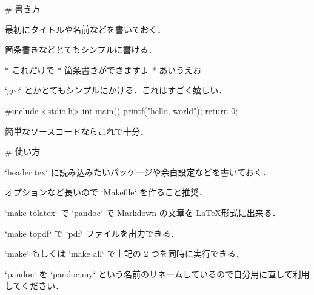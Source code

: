 % 


# 書き方

最初にタイトルや名前などを書いておく．

箇条書きなどとてもシンプルに書ける．

* これだけで
* 箇条書きができますよ
* あいうえお

`gcc` とかとてもシンプルにかける．これはすごく嬉しい．

    #include <stdio.h>
    int main() {
      printf("hello, world\n");
      return 0;
    }

簡単なソースコードならこれで十分．

# 使い方

`header.tex` に読み込みたいパッケージや余白設定などを書いておく．

オプションなど長いので `Makefile` を作ること推奨．

`make tolatex` で `pandoc` で Markdown の文章を \LaTeX 形式に出来る．

`make topdf` で `pdf` ファイルを出力できる．

`make` もしくは `make all` で上記の 2 つを同時に実行できる．

`pandoc` を `pandoc.my` という名前のリネームしているので自分用に直して利用してください．

